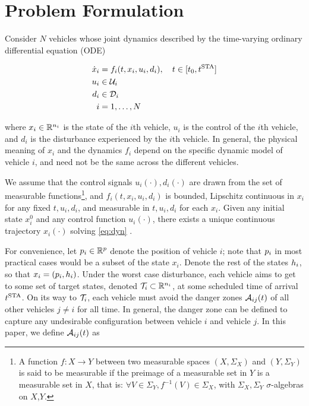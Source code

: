 \section{Problem Formulation \label{sec:formulation}}
Consider $N$ vehicles whose joint dynamics described by the time-varying ordinary differential equation (ODE)

\begin{equation}
\label{eq:dyn}
\begin{aligned}
\dot{x}_i &= f_i(t, x_i, u_i, d_i), \quad t \in [t_0, t^\text{STA}] \\
u_i &\in \mathcal{U}_i \\
d_i &\in \mathcal{D}_i \\
i &= 1,\ldots, N
\end{aligned}
\end{equation}

\noindent where $x_i \in \mathbb{R}^{n_i}$ is the state of the $i$th vehicle, $u_i$ is the control of the $i$th vehicle, and $d_i$ is the disturbance experienced by the $i$th vehicle. In general, the physical meaning of $x_i$ and the dynamics $f_i$ depend on the specific dynamic model of vehicle $i$, and need not be the same across the different vehicles. 

We assume that the control signals $u_i(\cdot), d_i(\cdot)$ are drawn from the set of measurable functions\footnote{
A function $f:X\to Y$ between two measurable spaces $(X,\Sigma_X)$ and $(Y,\Sigma_Y)$ is said to be measurable if the preimage of a measurable set in $Y$ is a measurable set in $X$, that is: $\forall V\in\Sigma_Y, f^{-1}(V)\in\Sigma_X$, with $\Sigma_X,\Sigma_Y$ $\sigma$-algebras on $X$,$Y$.}, and $f_i(t,x_i, u_i, d_i)$ is bounded, Lipschitz continuous in $x_i$ for any fixed $t, u_i, d_i$, and measurable in $t, u_i, d_i$ for each $x_i$. Given any initial state $x_i^0$ and any control function $u_i(\cdot)$, there exists a unique continuous trajectory $x_i(\cdot)$ solving \eqref{eq:dyn} \cite{Coddington55}.

For convenience, let $p_i \in \mathbb{R}^p$ denote the position of vehicle $i$; note that $p_i$ in most practical cases would be a subset of the state $x_i$. Denote the rest of the states $h_i$, so that $x_i = (p_i, h_i)$. Under the worst case disturbance, each vehicle aims to get to some set of target states, denoted $\mathcal{T}_i \subset \mathbb{R}^{n_i}$, at some scheduled time of arrival $t^\text{STA}$. On its way to $\mathcal{T}_i$, each vehicle must avoid the danger zones $\mathcal{A}_{ij}(t)$ of all other vehicles $j\neq i$ for all time. In general, the danger zone can be defined to capture any undesirable configuration between vehicle $i$ and vehicle $j$. In this paper, we define $\mathcal{A}_{ij}(t)$ as


